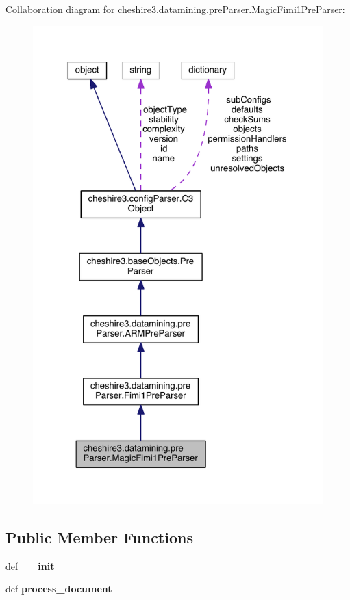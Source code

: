 Collaboration diagram for cheshire3.\-datamining.\-pre\-Parser.\-Magic\-Fimi1\-Pre\-Parser\-:
\nopagebreak
\begin{figure}[H]
\begin{center}
\leavevmode
\includegraphics[width=325pt]{classcheshire3_1_1datamining_1_1pre_parser_1_1_magic_fimi1_pre_parser__coll__graph}
\end{center}
\end{figure}
\subsection*{Public Member Functions}
\begin{DoxyCompactItemize}
\item 
\hypertarget{classcheshire3_1_1datamining_1_1pre_parser_1_1_magic_fimi1_pre_parser_a199e49986335fe36ab7c2bec881cd316}{def {\bfseries \-\_\-\-\_\-init\-\_\-\-\_\-}}\label{classcheshire3_1_1datamining_1_1pre_parser_1_1_magic_fimi1_pre_parser_a199e49986335fe36ab7c2bec881cd316}

\item 
\hypertarget{classcheshire3_1_1datamining_1_1pre_parser_1_1_magic_fimi1_pre_parser_a3abd4bd2f210eedd7f47e07285984fb0}{def {\bfseries process\-\_\-document}}\label{classcheshire3_1_1datamining_1_1pre_parser_1_1_magic_fimi1_pre_parser_a3abd4bd2f210eedd7f47e07285984fb0}

\end{DoxyCompactItemize}
